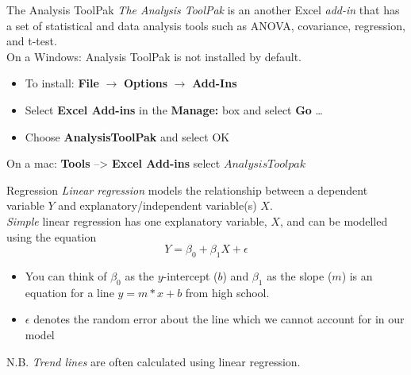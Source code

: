 \documentclass[xcolor=svgnames]{beamer}
\newcommand{\red}[1]{\textcolor{red}{#1}}
\newcommand{\ra}{$\rightarrow$ }
\begin{document}
\begin{frame}{The Analysis ToolPak}
\emph{The Analysis ToolPak} is an another Excel \emph{add-in} that has a set of statistical and data analysis tools such as ANOVA, covariance, regression, and t-test.\\[1em]

On a Windows: Analysis ToolPak is not installed by default.
\begin{itemize}
\item To install: {\bf File} $\rightarrow$ {\bf Options} \ra {\bf Add-Ins} 
\item Select {\bf Excel Add-ins} in the {\bf Manage:} box and select {\bf Go} \dots
\item Choose {\bf AnalysisToolPak} and select OK\\[2em]
\end{itemize}


On a mac: {\bf Tools} -->  {\bf Excel Add-ins} select $Analysis Toolpak$\\[2em]

\end{frame}



%
%
%


\begin{frame}[label=current]{Regression}
\emph{Linear regression} models the relationship between a dependent variable $Y$ and explanatory/independent variable(s) $X$. \\[1em]	
\textit{Simple} linear regression has one explanatory variable, $X$, and can be modelled using the equation
\begin{equation}
Y = \beta_0 +  \beta_1 X +  \epsilon
\end{equation}
\begin{itemize}
\item You can think of $\beta_0$  as the $y$-intercept ($b$) and  $\beta_1$ as the slope ($m$) is an equation for a line $y = m*x + b$ from high school.
\medskip
\item $\epsilon$ denotes the random error about the line which we cannot account for in our model
\end{itemize}
N.B. \emph{Trend lines} are often calculated using linear regression.
\end{frame}
\end{document}
